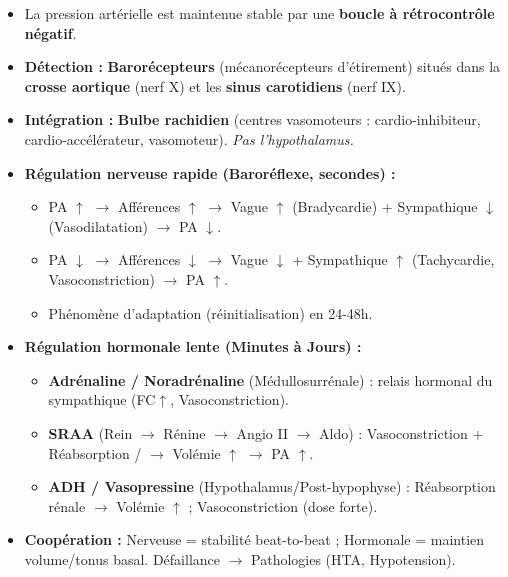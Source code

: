 \documentclass[11pt]{article}
\begin{document}
\begin{aretenir}
\begin{itemize}
\item La pression artérielle est maintenue stable par une \textbf{boucle à rétrocontrôle négatif}.
\item \textbf{Détection :} \textbf{Barorécepteurs} (mécanorécepteurs d'étirement) situés dans la \textbf{crosse aortique} (nerf X) et les \textbf{sinus carotidiens} (nerf IX).
\item \textbf{Intégration :} \textbf{Bulbe rachidien} (centres vasomoteurs : cardio-inhibiteur, cardio-accélérateur, vasomoteur). \textit{Pas l'hypothalamus.}
\item \textbf{Régulation nerveuse rapide (Baroréflexe, secondes) :}
      \begin{itemize}
      \item PA $\uparrow$ $\rightarrow$ Afférences $\uparrow$ $\rightarrow$ Vague $\uparrow$ (Bradycardie) + Sympathique $\downarrow$ (Vasodilatation) $\rightarrow$ PA $\downarrow$.
      \item PA $\downarrow$ $\rightarrow$ Afférences $\downarrow$ $\rightarrow$ Vague $\downarrow$ + Sympathique $\uparrow$ (Tachycardie, Vasoconstriction) $\rightarrow$ PA $\uparrow$.
      \item Phénomène d'adaptation (réinitialisation) en 24-48h.
      \end{itemize}
\item \textbf{Régulation hormonale lente (Minutes à Jours) :}
      \begin{itemize}
      \item \textbf{Adrénaline / Noradrénaline} (Médullosurrénale) : relais hormonal du sympathique (FC$\uparrow$, Vasoconstriction).
      \item \textbf{SRAA} (Rein $\rightarrow$ Rénine $\rightarrow$ Angio II $\rightarrow$ Aldo) : Vasoconstriction + Réabsorption / $\rightarrow$ Volémie $\uparrow$ $\rightarrow$ PA $\uparrow$.
      \item \textbf{ADH / Vasopressine} (Hypothalamus/Post-hypophyse) : Réabsorption  rénale $\rightarrow$ Volémie $\uparrow$ ; Vasoconstriction (dose forte).
      \end{itemize}
\item \textbf{Coopération :} Nerveuse = stabilité beat-to-beat ; Hormonale = maintien volume/tonus basal. Défaillance $\rightarrow$ Pathologies (HTA, Hypotension).
\end{itemize}
\end{aretenir}
\end{document}
